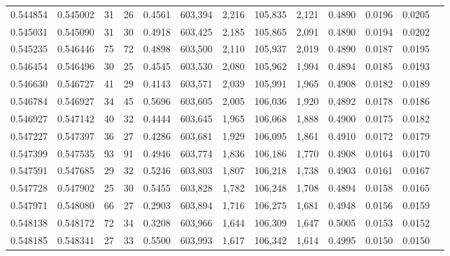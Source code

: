 \begin{tabular}{rrrrrrrrrrrrr}
0.544854 & 0.545002 &    31 &    26 &                                     0.4561 & 603,394 &   2,216 & 105,835 &   2,121 & 0.4890 & 0.0196 & 0.0205 \\
0.545031 & 0.545090 &    31 &    30 &                                     0.4918 & 603,425 &   2,185 & 105,865 &   2,091 & 0.4890 & 0.0194 & 0.0202 \\
0.545235 & 0.546446 &    75 &    72 &                                     0.4898 & 603,500 &   2,110 & 105,937 &   2,019 & 0.4890 & 0.0187 & 0.0195 \\
0.546454 & 0.546496 &    30 &    25 &                                     0.4545 & 603,530 &   2,080 & 105,962 &   1,994 & 0.4894 & 0.0185 & 0.0193 \\
0.546630 & 0.546727 &    41 &    29 &                                     0.4143 & 603,571 &   2,039 & 105,991 &   1,965 & 0.4908 & 0.0182 & 0.0189 \\
0.546784 & 0.546927 &    34 &    45 &                                     0.5696 & 603,605 &   2,005 & 106,036 &   1,920 & 0.4892 & 0.0178 & 0.0186 \\
0.546927 & 0.547142 &    40 &    32 &                                     0.4444 & 603,645 &   1,965 & 106,068 &   1,888 & 0.4900 & 0.0175 & 0.0182 \\
0.547227 & 0.547397 &    36 &    27 &                                     0.4286 & 603,681 &   1,929 & 106,095 &   1,861 & 0.4910 & 0.0172 & 0.0179 \\
0.547399 & 0.547535 &    93 &    91 &                                     0.4946 & 603,774 &   1,836 & 106,186 &   1,770 & 0.4908 & 0.0164 & 0.0170 \\
0.547591 & 0.547685 &    29 &    32 &                                     0.5246 & 603,803 &   1,807 & 106,218 &   1,738 & 0.4903 & 0.0161 & 0.0167 \\
0.547728 & 0.547902 &    25 &    30 &                                     0.5455 & 603,828 &   1,782 & 106,248 &   1,708 & 0.4894 & 0.0158 & 0.0165 \\
0.547971 & 0.548080 &    66 &    27 &                                     0.2903 & 603,894 &   1,716 & 106,275 &   1,681 & 0.4948 & 0.0156 & 0.0159 \\
0.548138 & 0.548172 &    72 &    34 &                                     0.3208 & 603,966 &   1,644 & 106,309 &   1,647 & 0.5005 & 0.0153 & 0.0152 \\
0.548185 & 0.548341 &    27 &    33 &                                     0.5500 & 603,993 &   1,617 & 106,342 &   1,614 & 0.4995 & 0.0150 & 0.0150 \\

\end{tabular}
